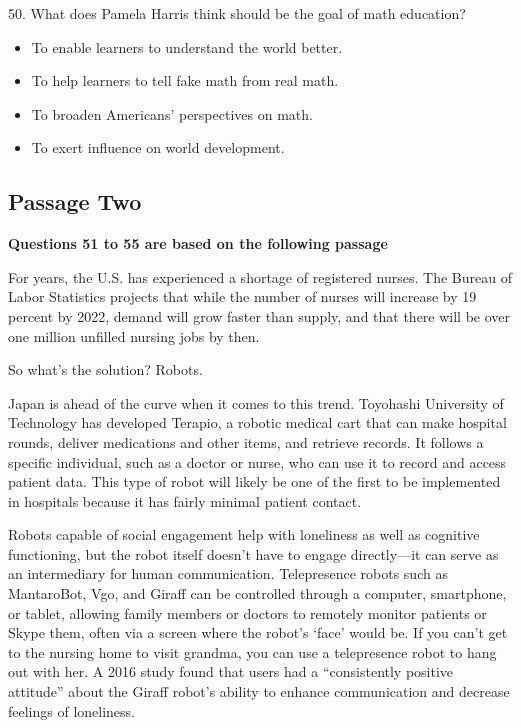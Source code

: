 \documentclass[UTF8,11pt]{ctexart}
\begin{document}
50. What does Pamela Harris think should be the goal of math education?


\begin{itemize}[leftmargin=2em,itemsep=.2em,topsep=.4em]\item[A.] To enable learners to understand the world better.
\item[B.] To help learners to tell fake math from real math.
\item[C.] To broaden Americans' perspectives on math.
\item[D.] To exert influence on world development.
\end{itemize}

\subsection*{\textbf{Passage Two}}


\textbf{Questions 51 to 55 are based on the following passage}


For years, the U.S. has experienced a shortage of registered nurses. The Bureau of Labor Statistics projects that while the number of nurses will increase by 19 percent by 2022, demand will grow faster than supply, and that there will be over one million unfilled nursing jobs by then.


So what's the solution? Robots.


Japan is ahead of the curve when it comes to this trend. Toyohashi University of Technology has developed Terapio, a robotic medical cart that can make hospital rounds, deliver medications and other items, and retrieve records. It follows a specific individual, such as a doctor or nurse, who can use it to record and access patient data. This type of robot will likely be one of the first to be implemented in hospitals because it has fairly minimal patient contact.


Robots capable of social engagement help with loneliness as well as cognitive functioning, but the robot itself doesn't have to engage directly—it can serve as an intermediary for human communication. Telepresence robots such as MantaroBot, Vgo, and Giraff can be controlled through a computer, smartphone, or tablet, allowing family members or doctors to remotely monitor patients or Skype them, often via a screen where the robot's ‘face’ would be. If you can't get to the nursing home to visit grandma, you can use a telepresence robot to hang out with her. A 2016 study found that users had a “consistently positive attitude” about the Giraff robot's ability to enhance communication and decrease feelings of loneliness.
\end{document}
